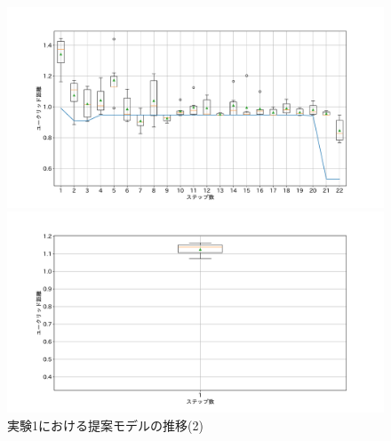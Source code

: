 \begin{figure}[h]
\begin{minipage}[b]{0.48\linewidth}
 \end{minipage}\\
 \begin{minipage}[b]{0.48\linewidth}
  \centering
  \includegraphics[scale=0.15]{./imgs/gaChange/cake1_8.pdf}
 \end{minipage}
 \begin{minipage}[b]{0.48\linewidth}
  \centering
  \includegraphics[scale=0.15]{./imgs/gaChange/cake2_8.pdf}
 \end{minipage}
 \caption{実験1における提案モデルの推移(2)}\label{fig:gaChange1_2}
\end{figure}

